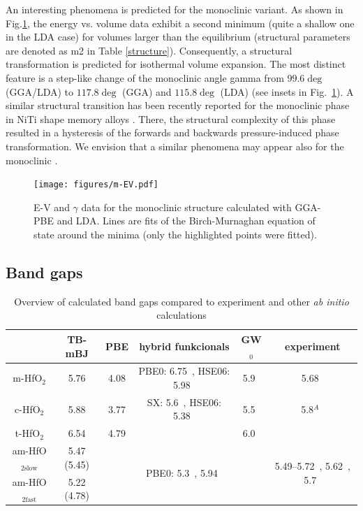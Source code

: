 \documentclass[10pt,a4paper,twocolumn]{article}
\begin{document}
An interesting phenomena is predicted for the monoclinic variant.
As shown in Fig.\ref{EV}, the energy vs. volume data exhibit a second minimum (quite a shallow one in the LDA case) for volumes larger than the equilibrium (structural parameters are denoted as m2 in Table \ref{structure}).
Consequently, a structural transformation is predicted for isothermal volume expansion.
The most distinct feature is a step-like change of the monoclinic angle gamma from $99.6\deg$ (GGA/LDA) to $117.8\deg$ (GGA) and $115.8\deg$ (LDA) (see insets in Fig.~\ref{EV}).
A similar structural transition has been recently reported for the monoclinic phase in NiTi shape memory alloys \cite{Holec2011-tg}.
There, the structural complexity of this phase resulted in a hysteresis of the forwards and backwards pressure-induced phase transformation.
We envision that a similar phenomena may appear also for the monoclinic .

\begin{figure}
\begin{center}
	\texttt{[image: figures/m-EV.pdf]}
	\caption{E-V and $\gamma$ data for the monoclinic structure calculated with GGA-PBE and LDA. Lines are fits of the Birch-Murnaghan equation of state around the minima (only the highlighted points were fitted).}
   \label{EV}
\end{center}
\end{figure}

\subsection{Band gaps}

\begin{table}
\begin{center}

\begin{tabular}{c|ccccc}
			& TB-mBJ & PBE & hybrid funkcionals & GW$_0$ & experiment \\
\hline
m-HfO$_2$ &	5.76 & 4.08 & PBE0: 6.75~\cite{Komsa2010}, HSE06: 5.98~\cite{Komsa2010} & 5.9~\cite{Gruning2010} & 5.68~\cite{Balog1977} \\
c-HfO$_2$ &	5.88 & 3.77 & SX: 5.6~\cite{Clark2010}, HSE06: 5.38~\cite{Yang2014} & 5.5~\cite{Gruning2010} & 5.8$^A$~\cite{Lim2002}\\
t-HfO$_2$ &	6.54 & 4.79 &  & 6.0~\cite{Gruning2010} & \\
am-HfO$_{2\mathrm{slow}}$ & 5.47 (5.45) & & \multirow{2}{*}{PBE0: 5.3~\cite{Broqvist2007}, 5.94~\cite{Chen2011}} &  & \multirow{2}{*}{5.49--5.72~\cite{Takeuchi2004}, 5.62~\cite{Nguyen2005}, 5.7~\cite{Perevalov2007}}\\
am-HfO$_{2\mathrm{fast}}$ & 5.22 (4.78) & &  &  & \\

\end{tabular}
\caption{Overview of calculated band gaps compared to experiment and other \textit{ab initio} calculations}
\label{gaps}
\end{center}
\end{table}
\end{document}
